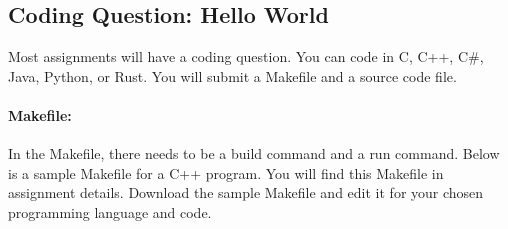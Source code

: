 \documentclass[solutionorbox, answers]{exam}
\begin{document}
\begin{questions}

\section*{Coding Question: Hello World}

Most assignments will have a coding question. You can code in C, C++, C\#, Java, Python, or Rust. You will submit a Makefile and a source code file.
\vspace{-0.5cm}

\paragraph{Makefile:} In the Makefile, there needs to be a build command and a run command. Below is a sample Makefile for a C++ program. You will find this Makefile in assignment details. Download the sample Makefile and edit it for your chosen programming language and code.


\end{questions}
\end{document}
